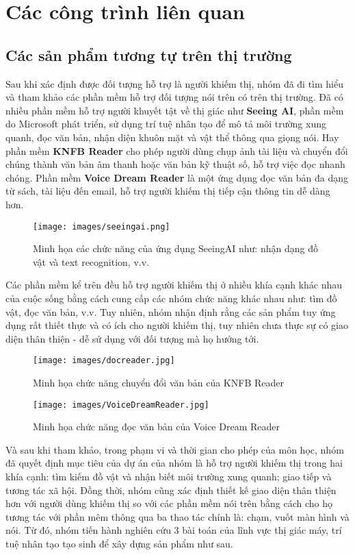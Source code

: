 \documentclass[a4paper,12pt]{article}
\begin{document}
\section{Các công trình liên quan}

\subsection{Các sản phẩm tương tự trên thị trường}
Sau khi xác định được đối tượng hỗ trợ là người khiếm thị, nhóm đã đi tìm hiểu và tham khảo các phần mềm hỗ trợ đối tượng nói trên có trên thị trường. Đã có nhiều phần mềm hỗ trợ người khuyết tật về thị giác như \textbf{Seeing AI}, phần mềm do Microsoft phát triển, sử dụng trí tuệ nhân tạo để mô tả môi trường xung quanh, đọc văn bản, nhận diện khuôn mặt và vật thể thông qua giọng nói. Hay phần mềm \textbf{KNFB Reader} \cite{dadhich2018real} cho phép người dùng chụp ảnh tài liệu và chuyển đổi chúng thành văn bản âm thanh hoặc văn bản kỹ thuật số, hỗ trợ việc đọc nhanh chóng. Phần mềm \textbf{Voice Dream Reader} là một ứng dụng đọc văn bản đa dạng từ sách, tài liệu đến email, hỗ trợ người khiếm thị tiếp cận thông tin dễ dàng hơn.

\begin{figure}[H]
    \centering
    \texttt{[image: images/seeingai.png]}
    \caption{Minh họa các chức năng của ứng dụng SeeingAI như: nhận dạng đồ vật và text recognition, v.v.}
\end{figure}
Các phần mềm kể trên đều hỗ trợ người khiếm thị ở nhiều khía cạnh khác nhau của cuộc sống bằng cách cung cấp các nhóm chức năng khác nhau như: tìm đồ vật, đọc văn bản, v.v. Tuy nhiên, nhóm nhận định rằng các sản phẩm tuy ứng dụng rất thiết thực và có ích cho người khiếm thị, tuy nhiên chưa thực sự có giao diện thân thiện - dễ sử dụng với đối tượng mà họ hướng tới. 
\begin{figure}[H]
    \centering
    \begin{minipage}{0.495\textwidth}
        \centering
        \texttt{[image: images/docreader.jpg]}
        \caption{Minh họa chức năng chuyển đổi văn bản của KNFB Reader}
    \end{minipage}
    \hfill
    \begin{minipage}{0.495\textwidth}
        \centering
        \texttt{[image: images/VoiceDreamReader.jpg]}
        \caption{Minh họa chức năng đọc văn bản của Voice Dream Reader}
    \end{minipage}
\end{figure}
Và sau khi tham khảo, trong phạm vi và thời gian cho phép của môn học, nhóm đã quyết định mục tiêu của dự án của nhóm là hỗ trợ người khiếm thị trong hai khía cạnh: tìm kiếm đồ vật và nhận biết môi trường xung quanh; giao tiếp và tương tác xã hội. Đồng thời, nhóm cũng xác định thiết kế giao diện thân thiện hơn với người dùng khiếm thị so với các phần mềm nói trên bằng cách cho họ tương tác với phần mêm thông qua ba thao tác chính là: chạm, vuốt màn hình và nói. Từ đó, nhóm tiến hành nghiên cứu 3 bài toán của lĩnh vực thị giác máy, trí tuệ nhân tạo tạo sinh để xây dựng sản phẩm như sau.
\end{document}
